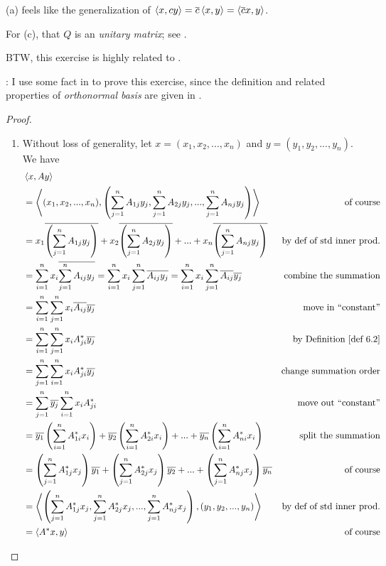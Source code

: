 \begin{note}
(a) feels like the generalization of \(\left< x, cy \right> = \overline{c} \left< x, y \right> = \left< \overline{c}x, y \right>\).

For (c), that \(Q\) is an \emph{unitary matrix}; see .

BTW, this exercise is highly related to .

: I use some fact in  to prove this exercise, since the definition and related properties of \emph{orthonormal basis} are given in .
\end{note}

\begin{proof} \ 

\begin{enumerate}
\item Without loss of generality, let \(x = (x_1, x_2, ..., x_n)\) and \(y = (y_1, y_2, ..., y_n)\).
We have
\begin{align*}
    & \LG x, Ay \RG \\
    & = \LG (x_1, x_2, ..., x_n), \left( \sum_{j = 1}^n A_{1j} y_j, \sum_{j = 1}^n A_{2j} y_j, ..., \sum_{j = 1}^n A_{nj} y_j \right) \RG & \text{of course} \\
    & = x_1 \conjugatet{\left( \sum_{j = 1}^n A_{1j} y_j \right)}
      + x_2 \conjugatet{\left( \sum_{j = 1}^n A_{2j} y_j \right)}
      + ...
      + x_n \conjugatet{\left( \sum_{j = 1}^n A_{nj} y_j \right)} & \text{by def of std inner prod.} \\
    & = \sum_{i = 1}^n x_i \conjugatet{\sum_{j = 1}^n A_{ij} y_j}
      = \sum_{i = 1}^n x_i \sum_{j = 1}^n \conjugatet{A_{ij} y_j}
      = \sum_{i = 1}^n x_i \sum_{j = 1}^n \conjugatet{A_{ij}} \conjugatet{y_j} & \text{combine the summation} \\
    & = \sum_{i = 1}^n \sum_{j = 1}^n x_i \conjugatet{A_{ij}} \conjugatet{y_j} & \text{move in ``constant''} \\
    & = \sum_{i = 1}^n \sum_{j = 1}^n x_i A^*_{ji} \conjugatet{y_j} & \text{by \DEF{6.2}} \\
    & = \sum_{j = 1}^n \sum_{i = 1}^n x_i A^*_{ji} \conjugatet{y_j} & \text{change summation order} \\
    & = \sum_{j = 1}^n \conjugatet{y_j} \sum_{i = 1}^n x_i A^*_{ji} & \text{move out ``constant''} \\
    & = \conjugatet{y_1} \left( \sum_{i = 1}^n A^*_{1i} x_i \right)
      + \conjugatet{y_2} \left( \sum_{i = 1}^n A^*_{2i} x_i \right)
      + ...
      + \conjugatet{y_n} \left( \sum_{i = 1}^n A^*_{ni} x_i \right) & \text{split the summation} \\
    & = \left( \sum_{j = 1}^n A^*_{1j} x_j \right) \conjugatet{y_1}
      + \left( \sum_{j = 1}^n A^*_{2j} x_j \right) \conjugatet{y_2}
      + ...
      + \left( \sum_{j = 1}^n A^*_{nj} x_j \right) \conjugatet{y_n} & \text{of course} \\
    & = \LG \left( \sum_{j = 1}^n A^*_{1j} x_j, \sum_{j = 1}^n A^*_{2j} x_j, ..., \sum_{j = 1}^n A^*_{nj} x_j \right), (y_1, y_2, ..., y_n) \RG & \text{by def of std inner prod.} \\
    & = \LG A^* x, y \RG & \text{of course}
\end{align*}


\end{enumerate}
\end{proof}
